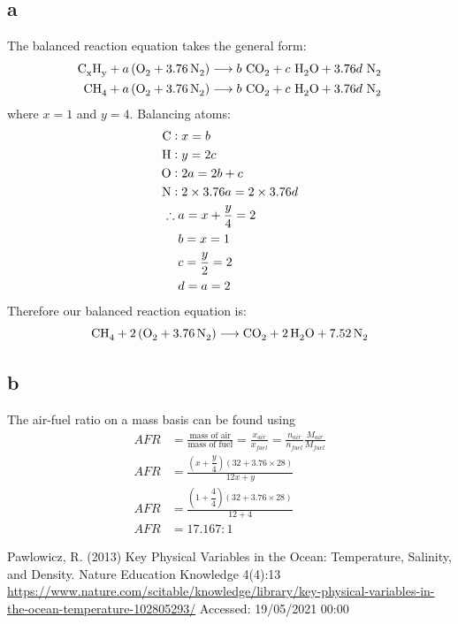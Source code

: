 \documentclass[11pt]{article}
\numberwithin{equation}{section}
\begin{document}
\subsection{a}
The balanced reaction equation takes the general form:
\begin{align}
    \ce{C_x H_y} + a \left(\ce{O2} + \ce{3.76N2}\right)&\longrightarrow b \ \ce{CO2} + c \ \ce{H2O} + 3.76 d \ \ce{N2}\\
    \ce{C H4} + a \left(\ce{O2} + \ce{3.76N2}\right)&\longrightarrow b \ \ce{CO2} + c \ \ce{H2O} + 3.76 d \ \ce{N2}
\end{align}
where $x = 1$ and $y= 4$. Balancing atoms:
\begin{align}
    \ce{C}:& \; x = b\\
    \ce{H}:& \; y = 2c\\
    \ce{O}:& \; 2a = 2b + c\\
    \ce{N}:& \; 2\times 3.76 a = 2\times 3.76 d\\
    \therefore \; &a = x + \frac{y}{4} = 2\\
    &b = x = 1\\
    &c = \frac{y}{2} = 2\\
    &d = a = 2
\end{align}
Therefore our balanced reaction equation is:
\begin{equation}
    \ce{CH4} + 2\left(\ce{O2} + \ce{3.76N2}\right)\longrightarrow \ce{CO2} + \ce{2H2O} + \ce{7.52N2}
\end{equation}
\subsection{b}
The air-fuel ratio on a mass basis can be found using \label{eq:q4b1}
\begin{align}
    AFR &= \frac{\textrm{mass of air}}{\textrm{mass of fuel}} = \frac{x_{air}}{x_{fuel}} = \frac{n_{air}}{n_{fuel}}\frac{M_{air}}{M_{fuel}}\\
    AFR &= \frac{\left(x+ \dfrac{y}{4}\right)\left(32 + 3.76\times 28\right)}{12x + y}\\
    AFR &= \frac{\left(1+ \dfrac{4}{4}\right)\left(32 + 3.76\times 28\right)}{12 + 4}\\
    AFR &= 17.167:1 
\end{align}
\begin{thebibliography}{00}
     Pawlowicz, R. (2013) Key Physical Variables in the Ocean: Temperature, Salinity, and Density. Nature Education Knowledge 4(4):13 \url{https://www.nature.com/scitable/knowledge/library/key-physical-variables-in-the-ocean-temperature-102805293/} Accessed: 19/05/2021 00:00
\end{thebibliography}
\end{document}
